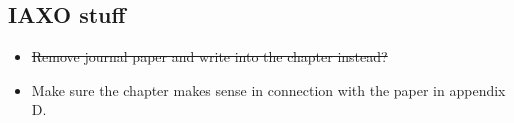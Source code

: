 \subsection{IAXO stuff}
\begin{itemize}
  \item \st{ Remove journal paper and write into the chapter instead?}
  \item Make sure the chapter makes sense in connection with the paper in appendix D.
\end{itemize}
